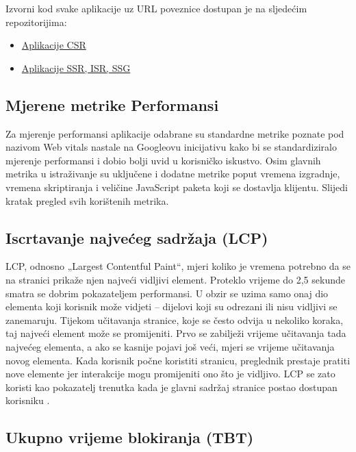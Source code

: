 \bigskip
Izvorni kod svake aplikacije uz URL poveznice dostupan je na sljedećim repozitorijima:

\begin{itemize}
    \item \href{https://github.com/AlphaActual/render-strategy-demo-csr}{Aplikacije CSR}
    \item \href{https://github.com/AlphaActual/render-strategy-demo}{Aplikacije SSR, ISR, SSG}
\end{itemize}

\subsection{Mjerene metrike Performansi}

Za mjerenje performansi aplikacije odabrane su standardne metrike poznate pod nazivom Web vitals nastale na Googleovu inicijativu kako bi se standardiziralo mjerenje performansi i dobio bolji uvid u korisničko iskustvo. Osim glavnih metrika u istraživanje su uključene i dodatne metrike poput vremena izgradnje, vremena skriptiranja i veličine JavaScript paketa koji se dostavlja klijentu. Slijedi kratak pregled svih korištenih metrika.

\subsection{Iscrtavanje najvećeg sadržaja (LCP)}

LCP, odnosno „Largest Contentful Paint“, mjeri koliko je vremena potrebno da se na stranici prikaže njen najveći vidljivi element. Proteklo vrijeme do 2,5 sekunde smatra se dobrim pokazateljem performansi. U obzir se uzima samo onaj dio elementa koji korisnik može vidjeti – dijelovi koji su odrezani ili nisu vidljivi se zanemaruju. Tijekom učitavanja stranice, koje se često odvija u nekoliko koraka, taj najveći element može se promijeniti. Prvo se zabilježi vrijeme učitavanja tada najvećeg elementa, a ako se kasnije pojavi još veći, mjeri se vrijeme učitavanja novog elementa. Kada korisnik počne koristiti stranicu, preglednik prestaje pratiti nove elemente jer interakcije mogu promijeniti ono što je vidljivo. LCP se zato koristi kao pokazatelj trenutka kada je glavni sadržaj stranice postao dostupan korisniku \cite{nordstrom2023comparison}.

\subsection{Ukupno vrijeme blokiranja (TBT)}


